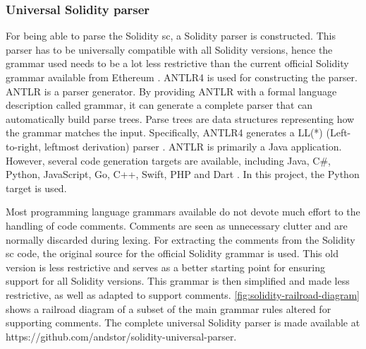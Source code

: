 \subsubsection{Universal Solidity parser}
\label{sec:universal-solidity-parser}
For being able to parse the Solidity \acrshort{sc}, a Solidity parser is constructed. This parser has to be universally compatible with all Solidity versions, hence the grammar used needs to be a lot less restrictive than the current official Solidity grammar available from Ethereum \cite{soliditygrammar}. ANTLR4 \cite{antlr4} is used for constructing the parser. ANTLR is a parser generator. By providing ANTLR with a formal language description called grammar, it can generate a complete parser that can automatically build parse trees. Parse trees are data structures representing how the grammar matches the input. Specifically, ANTLR4 generates a LL(*) (Left-to-right, leftmost derivation) parser \cite{parr2011llstar}. ANTLR is primarily a Java application. However, several code generation targets are available, including Java, C\#, Python, JavaScript, Go, C++, Swift, PHP and Dart \cite{antlr-targets}. In this project, the Python target is used.

Most programming language grammars available do not devote much effort to the handling of code comments. Comments are seen as unnecessary clutter and are normally discarded during lexing. For extracting the comments from the Solidity \acrshort{sc} code, the original source \cite{solidity-antlr4} for the official Solidity grammar \cite{soliditygrammar} is used. This old version is less restrictive and serves as a better starting point for ensuring support for all Solidity versions. This grammar is then simplified and made less restrictive, as well as adapted to support comments. \cref{fig:solidity-railroad-diagram} shows a railroad diagram of a subset of the main grammar rules altered for supporting comments. The complete universal Solidity parser is made available at https://github.com/andstor/solidity-universal-parser.


